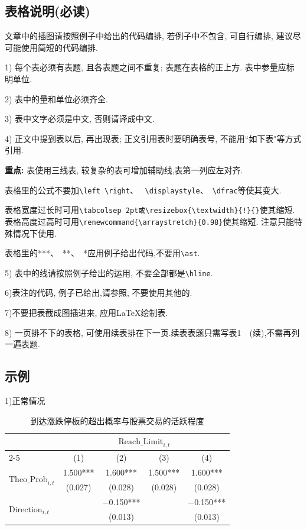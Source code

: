 \documentclass{setp-new}
\begin{document}
\subsection{表格说明(必读)}

文章中的插图请按照例子中给出的代码编排, 若例子中不包含, 可自行编排, 建议尽可能使用简短的代码编排.


1) 每个表必须有表题, 且各表题之间不重复; 表题在表格的正上方. 表中参量应标明单位.

2) 表中的量和单位必须齐全.

3) 表中文字必须是中文, 否则请译成中文.

4) 正文中提到表以后, 再出现表; 正文引用表时要明确表号, 不能用``如下表"等方式引用.


{\bf 重点:}  表使用三线表, 较复杂的表可增加辅助线,表第一列应左对齐.


  表格里的公式不要加\verb|\left \right|、~ \verb|\displaystyle|、~\verb|\dfrac|等使其变大.

表格宽度过长时可用\verb|\tabcolsep 2pt或\resizebox{\textwidth}{!}{}|使其缩短.\\
表格高度过高时可用\verb|\renewcommand{\arraystretch}{0.98}|使其缩短. 注意只能特殊情况下使用.

 表格里的***、~**、~*应用例子给出代码,不要用\verb|\ast|.


5) 表中的线请按照例子给出的运用, 不要全部都是\verb|\hline|.

6)表注的代码, 例子已给出,请参照, 不要使用其他的.

7)不要把表截成图插进来, 应用\LaTeX 绘制表.

8)  一页排不下的表格, 可使用续表排在下一页.续表表题只需写表1\ \ (续),不需再列一遍表题.



\subsection{示例}

1)正常情况
\begin{table}[H]
\centering
\caption{到达涨跌停板的超出概率与股票交易的活跃程度}
\label{tab1}
\tabcolsep 9pt
\begin{tabular}{lcccc}%
\toprule
& \multicolumn{4}{c}{$\text{Reach\_Limit}_{i, t}$} \\
\cmidrule{2-5}
 & (1) & (2) & (3) & (4) \\
\midrule
\multirow{2}{*}{$\text{Theo\_Prob}_{i, t}$} & 1.500***& 1.600*** & 1.500***& 1.600*** \\
 & (0.027) & (0.028) & (0.028) & (0.028) \\
\multirow{2}{*}{$\text{Direction}_{i, t}$} & & $-$0.150***& & $-$0.150*** \\
 & & (0.013) & & (0.013) \\
\bottomrule
\end{tabular}
\end{table}
\end{document}
